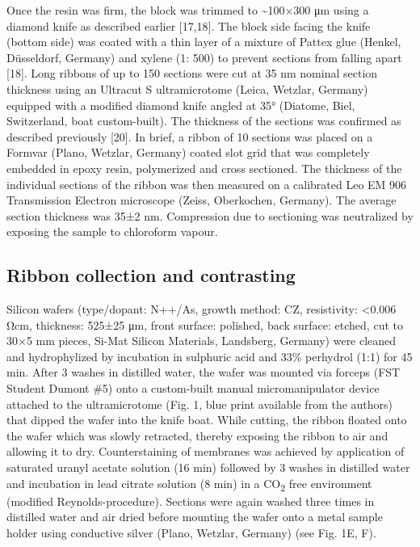 \documentclass{article}
\begin{document}
Once the resin was firm, the block was trimmed to \textasciitilde{}100×300 μm using a diamond knife as described earlier [17,18]. The block side facing the knife (bottom side) was coated with a thin layer of a mixture of Pattex glue (Henkel, Düsseldorf, Germany) and xylene (1: 500) to prevent sections from falling apart [18]. Long ribbons of up to 150 sections were cut at 35 nm nominal section thickness using an Ultracut S ultramicrotome (Leica, Wetzlar, Germany) equipped with a modified diamond knife angled at 35° (Diatome, Biel, Switzerland, boat custom-built). The thickness of the sections was confirmed as described previously [20]. In brief, a ribbon of 10 sections was placed on a Formvar (Plano, Wetzlar, Germany) coated slot grid that was completely embedded in epoxy resin, polymerized and cross sectioned. The thickness of the individual sections of the ribbon was then measured on a calibrated Leo EM 906 Transmission Electron microscope (Zeiss, Oberkochen, Germany). The average section thickness was 35±2 nm. Compression due to sectioning was neutralized by exposing the sample to chloroform vapour.

\subsection*{Ribbon collection and contrasting}

Silicon wafers (type/dopant: N++/As, growth method: CZ, resistivity: <0.006 Ωcm, thickness: 525±25 μm, front surface: polished, back surface: etched, cut to 30×5 mm pieces, Si-Mat Silicon Materials, Landsberg, Germany) were cleaned and hydrophylized by incubation in sulphuric acid and 33\% perhydrol (1:1) for 45 min. After 3 washes in distilled water, the wafer was mounted via forceps (FST Student Dumont \#5) onto a custom-built manual micromanipulator device attached to the ultramicrotome (Fig. 1, blue print available from the authors) that dipped the wafer into the knife boat. While cutting, the ribbon floated onto the wafer which was slowly retracted, thereby exposing the ribbon to air and allowing it to dry. Counterstaining of membranes was achieved by application of saturated uranyl acetate solution (16 min) followed by 3 washes in distilled water and incubation in lead citrate solution (8 min) in a CO\textsubscript{2} free environment (modified Reynolds-procedure). Sections were again washed three times in distilled water and air dried before mounting the wafer onto a metal sample holder using conductive silver (Plano, Wetzlar, Germany) (see Fig. 1E, F).
\end{document}
